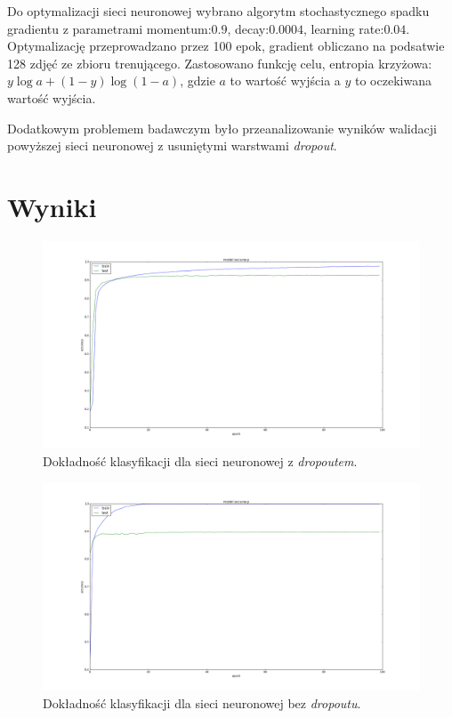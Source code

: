 \documentclass[12pt]{article}
\begin{document}
Do optymalizacji sieci neuronowej wybrano algorytm stochastycznego spadku gradientu z parametrami momentum:$0.9$, decay:$0.0004$, learning rate:$0.04$. Optymalizację przeprowadzano przez 100 epok, gradient obliczano na podsatwie 128 zdjęć ze zbioru trenującego. Zastosowano funkcję celu, entropia krzyżowa: $y\log a + (1-y)\log(1-a)$, gdzie $a$ to wartość wyjścia a $y$ to oczekiwana wartość wyjścia.

Dodatkowym problemem badawczym było przeanalizowanie wyników walidacji powyższej sieci neuronowej z usuniętymi warstwami \textit{dropout}.

\section{Wyniki}

\begin{figure}[!h]
\centering
\includegraphics[scale=0.25]{acc_dropout}
\caption{Dokładność klasyfikacji dla sieci neuronowej z \textit{dropoutem}.}
\end{figure}

\begin{figure}[!h]
\centering
\includegraphics[scale=0.25]{acc_no_dropout}
\caption{Dokładność klasyfikacji dla sieci neuronowej bez \textit{dropoutu}.}
\end{figure}
\end{document}
